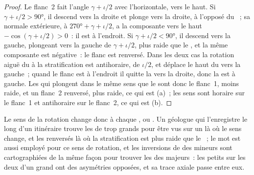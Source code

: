 \begin{proof}
Le flanc~2 fait l'angle $\gamma + \iota/2$ avec l'horizontale, vers le haut. Si
$\gamma + \iota/2 > \ang{90}$, il descend vers la droite et plonge vers la
droite, à l'opposé du ~; sa normale extérieure, à $\ang{270} + \gamma +
\iota/2$, a la composante vers le haut $-\cos(\gamma + \iota/2) > 0$~: il est à
l'endroit. Si $\gamma + \iota/2 < \ang{90}$, il descend vers la gauche,
plongeant vers la gauche de $\gamma + \iota/2$, plus raide que le , et
la même composante est négative~: le flanc est renversé. Dans les deux cas la rotation
aiguë du  à la stratification est antihoraire, de $\iota/2$,
et déplace le haut du  vers la gauche~; quand le flanc est à l'endroit
il quitte la  vers la droite, donc la  est à gauche. Les 
qui plongent dans le même sens que le  sont donc le flanc~1, moins raide, et un
flanc~2 renversé, plus raide, ce qui est (a)~; les sens sont horaire sur le flanc~1
et antihoraire sur le flanc~2, ce qui est (b).
\end{proof}

Le sens de la rotation change donc à chaque ,  ou .
Un géologue qui l'enregistre le long d'un itinéraire trouve les  de  trop
grands pour être vus sur un  là où le sens change, et les  renversés
là où la stratification est plus raide que le ~; le mot  est aussi employé
pour ce sens de rotation, et les inversions de  des  mineurs sont
cartographiées de la même façon pour trouver les  des  majeurs~: les petits  sur
les deux  d'un grand ont des asymétries opposées, et sa trace axiale
passe entre eux.

